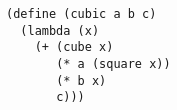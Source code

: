 \documentclass[a4paper,12pt]{article}
\begin{document}
\begin{lstlisting}
(define (cubic a b c)
  (lambda (x)
    (+ (cube x)
       (* a (square x))
       (* b x)
       c)))
\end{lstlisting}
\end{document}
